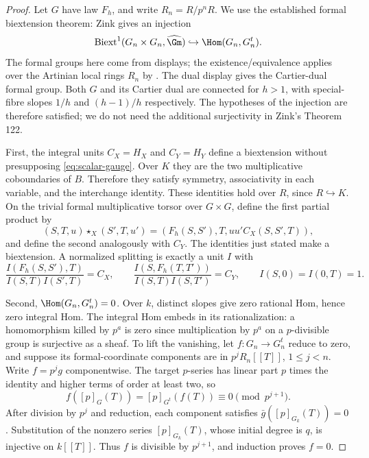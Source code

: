 \begin{proof}
Let $G$ have law $F_h$, and write $R_n=R/p^nR$. We use the established formal biextension theorem: Zink \cite[\S4.4, Proposition 121 and (243), pp.~241, 246]{Zink} gives an injection
\[
 \operatorname{Biext}^1(G_n\times G_n,\widehat{\Gm})
 \hookrightarrow\Hom(G_n,G_n^t).
\]
The formal groups here come from displays; the existence/equivalence applies over the Artinian local rings $R_n$ by \cite[Theorem 9, or Theorem 103]{Zink}. The dual display gives the Cartier-dual formal group. Both $G$ and its Cartier dual are connected for $h>1$, with special-fibre slopes $1/h$ and $(h-1)/h$ respectively. The hypotheses of the injection are therefore satisfied; we do not need the additional surjectivity in Zink's Theorem 122.

First, the integral units $C_X=H_X$ and $C_Y=H_Y$ define a biextension without presupposing \eqref{eq:scalar-gauge}. Over $K$ they are the two multiplicative coboundaries of $B$. Therefore they satisfy symmetry, associativity in each variable, and the interchange identity. These identities hold over $R$, since $R\hookrightarrow K$. On the trivial formal multiplicative torsor over $G\times G$, define the first partial product by
\[
 (S,T,u)\star_X(S',T,u')
  =(F_h(S,S'),T,uu'C_X(S,S',T)),
\]
and define the second analogously with $C_Y$. The identities just stated make a biextension. A normalized splitting is exactly a unit $I$ with
\begin{equation}\label{eq:gauge-split}
 \frac{I(F_h(S,S'),T)}{I(S,T)I(S',T)}=C_X,\qquad
 \frac{I(S,F_h(T,T'))}{I(S,T)I(S,T')}=C_Y,
 \qquad I(S,0)=I(0,T)=1.
\end{equation}

Second, $\Hom(G_n,G_n^t)=0$. Over $k$, distinct slopes give zero rational Hom, hence zero integral Hom. The integral Hom embeds in its rationalization: a homomorphism killed by $p^a$ is zero since multiplication by $p^a$ on a $p$-divisible group is surjective as a sheaf. To lift the vanishing, let $f:G_n\to G_n^t$ reduce to zero, and suppose its formal-coordinate components are in $p^jR_n[[T]]$, $1\le j<n$. Write $f=p^jg$ componentwise. The target $p$-series has linear part $p$ times the identity and higher terms of order at least two, so
\[
 f([p]_G(T))=[p]_{G^t}(f(T))\equiv0\pmod {p^{j+1}}.
\]
After division by $p^j$ and reduction, each component satisfies $\bar g([p]_{G_k}(T))=0$. Substitution of the nonzero series $[p]_{G_k}(T)$, whose initial degree is $q$, is injective on $k[[T]]$. Thus $f$ is divisible by $p^{j+1}$, and induction proves $f=0$.


\end{proof}
